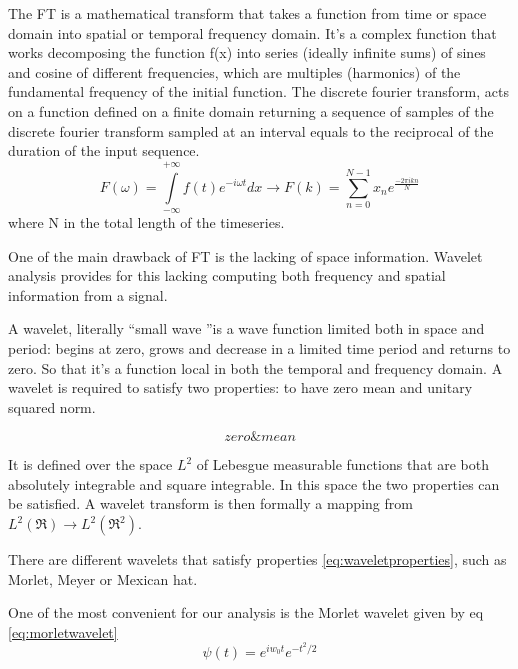 \documentclass[a4paper,11pt]{article}
\begin{document}
The FT is a mathematical transform that takes a function from time or space domain into spatial or temporal frequency domain. It's a complex function that works decomposing the function f(x) into series (ideally infinite sums) of sines and cosine of different frequencies, which are multiples (harmonics) of the fundamental frequency of the initial function.
The discrete fourier transform, acts on a function defined on a finite domain returning a sequence of samples of the discrete fourier transform sampled at an interval equals to the reciprocal of the duration of the input sequence.
\begin{equation}
F(\omega) = \int\limits_{-\infty}^{+\infty} f(t)e^{-i \omega t} dx \longrightarrow F(k) = \sum_{n = 0}^{N-1}x_n e^{\frac{-2\pi i k n}{N}}
\end{equation}
where N in the total length of the timeseries.

One of the main drawback of FT is the lacking of space information.
Wavelet analysis provides for this lacking computing both frequency and spatial information from a signal.


A wavelet, literally \textquotedblleft small wave \textquotedblright is a wave function limited both in space and period: begins at zero, grows and decrease in a limited time period and returns to zero. So that it's a function local in both the temporal and frequency domain.
A wavelet is required to satisfy two properties: to have zero mean and unitary squared norm.

\begin{equation}\label{eq:waveletproperties}
zero \& mean
\end{equation}

It is defined over the space $L^2$ of Lebesgue measurable functions that are both absolutely integrable and square integrable. In this space the two properties can be satisfied. A wavelet transform is then formally a mapping from $L^2(\Re) \rightarrow L^2(\Re^2)$.


There are different wavelets that satisfy properties \ref{eq:waveletproperties}, such as Morlet, Meyer or Mexican hat.

One of the most convenient for our analysis is the Morlet wavelet given by eq \ref{eq:morletwavelet}
\begin{equation}\label{eq:morletwavelet}
\psi\left(t\right) = e^{iw_0 t}e^{-t^2/2}
\end{equation}
\end{document}
